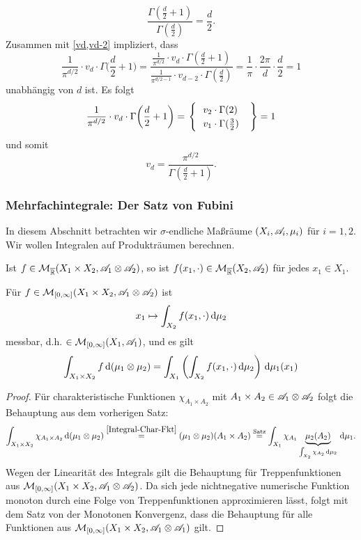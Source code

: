 \begin{example}
{$$\frac{\Gamma(\frac{d}{2}+1)}{\Gamma(\frac{d}{2})}=\frac{d}{2}.$$
Zusammen mit \eqref{vd,vd-2} impliziert, dass
$$\frac{1}{\pi^{d/2}}\cdot v_d \cdot \Gamma \bigg(\frac{d}{2}+1\bigg) = 
\frac{\frac{1}{\pi^{d/2}} \cdot v_d \cdot \Gamma(\frac{d}{2}+1)}
{ 
\frac{1}{\pi^{d/2-1}} \cdot v_{d-2} \cdot \Gamma(\frac{d}{2})} = \frac{1}{\pi} \cdot \frac{2\pi}{d}\cdot \frac{d}{2}=1$$
unabhängig von $d$ ist. Es folgt
$$\frac{1}{\pi^{d/2}}\cdot v_d \cdot \Gamma\bigg(\frac{d}{2}+1\bigg) = \begin{rcases}\begin{cases}
\ \ v_2 \cdot \Gamma(2)\\
\ \ v_1 \cdot \Gamma(\frac{3}{2})
\end{cases} \end{rcases}=1$$
und somit
\begin{equation}
v_d = \frac{\pi^{d/2}}{\Gamma(\frac{d}{2}+1)}.
\end{equation}
}
\end{example}

\subsubsection{Mehrfachintegrale: Der Satz von Fubini}
In diesem Abschnitt betrachten wir $\sigma$-endliche  Maßräume $(X_i,\AA_i,\mu_i)$ für  $i=1,2$. Wir wollen Integralen auf Produkträumen berechnen.		
\begin{beobachtung}
Ist $f \in \MM_{\ol\R}(X_1\times X_2, \AA_1 \otimes \AA_2)$, so ist $f(x_1, \cdot) \in \MM_{\ol\R}(X_2,\AA_2)$ für jedes $x_1 \in X_1$.
\end{beobachtung}

\begin{satz}
\begin{mdframed}
Für $f\in \MM_{[0,\infty]}(X_1 \times X_2, \AA_1 \otimes \AA_2)$ ist $$x_1 \mapsto \int_{X_2} f(x_1,\cdot )\D\mu_2$$
messbar, d.h. $\in \MM_{[0,\infty]}(X_1,\AA_1)$, und es gilt
\begin{equation*}
\int_{X_1\times X_2}f \D(\mu_1\otimes\mu_2) = \int_{X_1}\left(\int_{X_2}f(x_1,\cdot)\D\mu_2\right)\D\mu_1(x_1)
\end{equation*}
\end{mdframed}
\begin{proof}
Für charakteristische Funktionen $\chi_{A_1\times A_2}$ mit $A_1 \times A_2 \in \AA_1 \otimes \AA_2$ folgt die Behauptung aus dem vorherigen Satz: 
$$\int_{X_1 \times X_2} \chi_{A_1\times A_2} \D (\mu_1 \otimes \mu_2) \overset{\eqref{Integral-Char-Fkt}}= (\mu_1 \otimes \mu_2) (A_1\times A_2) \overset{\te{Satz}}= \int_{X_1} \chi_{A_1} \underbrace{\mu_2(A_2)}_{\int_{X_2} \chi_{A_2} \D\mu_2} \D \mu_1.
$$
Wegen der Linearität des Integrals gilt die Behauptung für Treppenfunktionen aus $\MM_{[0,\infty]}(X_1\times X_2,\AA_1\otimes \AA_2)$. Da sich jede nichtnegative numerische Funktion monoton durch eine Folge von Treppenfunktionen approximieren lässt, folgt mit dem Satz von der Monotonen Konvergenz, dass die Behauptung für alle Funktionen aus $\MM_{[0,\infty]}(X_1\times X_2,\AA_1\otimes \AA_1)$ gilt.
\end{proof}
\end{satz}

